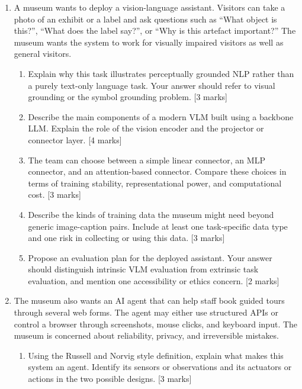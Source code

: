 \documentclass[11pt,a4paper]{article}
\newcommand{\pts}[1]{\hfill [#1 marks]}
\begin{document}
\begin{enumerate}[leftmargin=*]

\item A museum wants to deploy a vision-language assistant. Visitors can take a photo of an exhibit or a label and ask questions such as ``What object is this?'', ``What does the label say?'', or ``Why is this artefact important?'' The museum wants the system to work for visually impaired visitors as well as general visitors.

\begin{enumerate}
\item Explain why this task illustrates perceptually grounded NLP rather than a purely text-only language task. Your answer should refer to visual grounding or the symbol grounding problem. \pts{3}

\item Describe the main components of a modern VLM built using a backbone LLM. Explain the role of the vision encoder and the projector or connector layer. \pts{4}

\item The team can choose between a simple linear connector, an MLP connector, and an attention-based connector. Compare these choices in terms of training stability, representational power, and computational cost. \pts{3}

\item Describe the kinds of training data the museum might need beyond generic image-caption pairs. Include at least one task-specific data type and one risk in collecting or using this data. \pts{3}

\item Propose an evaluation plan for the deployed assistant. Your answer should distinguish intrinsic VLM evaluation from extrinsic task evaluation, and mention one accessibility or ethics concern. \pts{2}
\end{enumerate}

\newpage

\item The museum also wants an AI agent that can help staff book guided tours through several web forms. The agent may either use structured APIs or control a browser through screenshots, mouse clicks, and keyboard input. The museum is concerned about reliability, privacy, and irreversible mistakes.

\begin{enumerate}
\item Using the Russell and Norvig style definition, explain what makes this system an agent. Identify its sensors or observations and its actuators or actions in the two possible designs. \pts{3}


\end{enumerate}
\end{enumerate}
\end{document}
